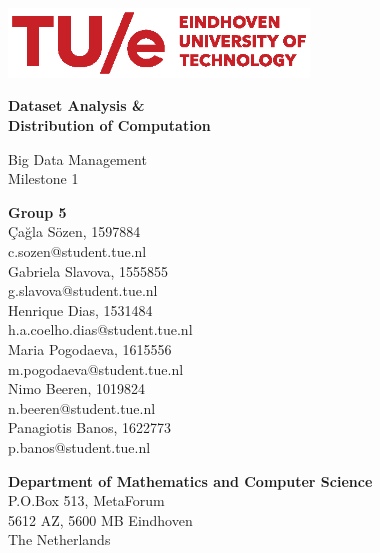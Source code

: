 \documentclass{article}
\date{\vspace{-2ex}}
\begin{document}
\begin{titlepage}
    \begin{center}
        \includegraphics[width=0.6\textwidth]{tuelogo}
    
        \vspace*{1cm}
    
        {\huge \textbf{Dataset Analysis \& \\ Distribution of Computation}}\\
        \vspace*{0.25cm}
        
        {\Large Big Data Management}\\
        
        \large{Milestone 1}
    
    \end{center}
    
    \vfill
       
    {\parindent0pt
        \textbf{Group 5}\\
        
        Çağla Sözen, 1597884\\
        c.sozen@student.tue.nl\\
        
        Gabriela Slavova, 1555855\\
        g.slavova@student.tue.nl\\
        
        Henrique Dias, 1531484\\
        h.a.coelho.dias@student.tue.nl\\
        
        Maria Pogodaeva, 1615556\\
        m.pogodaeva@student.tue.nl\\
        
        Nimo Beeren, 1019824\\
        n.beeren@student.tue.nl\\
        
        Panagiotis Banos, 1622773\\
        p.banos@student.tue.nl\\
        
        \vspace*{1cm}
    
        \textbf{Department of Mathematics and Computer Science}\\
        P.O.Box 513, MetaForum\\
        5612 AZ, 5600 MB Eindhoven\\
        The Netherlands
    }
\end{titlepage}
\end{document}
